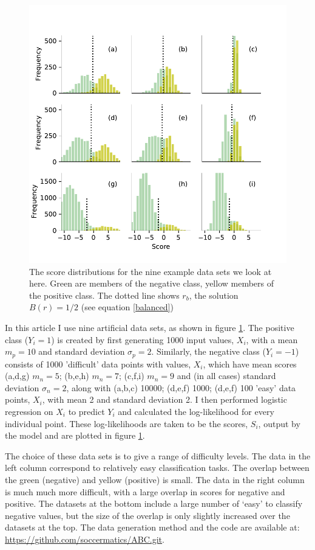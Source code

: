 \documentclass{article}
\begin{document}
\begin{figure}[t]
\centering
\includegraphics[scale=1]{Distribution.pdf}
\caption{The score distributions for the nine example data sets we look at here. Green are members of the negative class, yellow members of the positive class. The dotted line shows $r_b$, the solution $B(r)=1/2$ (see equation \ref{balanced})} \label{fig:Distribution}
\end{figure}

In this article I use nine artificial data sets, as shown in figure \ref{fig:Distribution}. The positive class ($Y_i=1$) is created by first generating 1000 input values, $X_i$, with a mean $m_p=10$ and standard deviation $\sigma_p=2$. Similarly, the negative class ($Y_i=-1$) consists of 1000 'difficult' data points with values, $X_i$, which have mean scores (a,d,g) $m_n=5$; (b,e,h) $m_n=7$; (c,f,i) $m_n=9$ and (in all cases) standard deviation $\sigma_n=2$, along with (a,b,c) 10000; (d,e,f) 1000; (d,e,f) 100 'easy' data points, $X_i$, with mean 2 and standard deviation 2.  I then performed logistic regression on $X_i$ to predict $Y_i$ and calculated the log-likelihood for every individual point. These log-likelihoods are taken to be the scores, $S_i$, output by the model and are plotted in figure \ref{fig:Distribution}. 

The choice of these data sets is to give a range of difficulty levels. The data in the left column correspond to relatively easy classification tasks. The overlap between the green (negative) and yellow (positive) is small. The data in the right column is much much more difficult, with a large overlap in scores for negative and positive. The datasets at the bottom include a large number of `easy' to classify negative values, but the size of the overlap is only slightly increased over the datasets at the top. The data generation method and the code are available at: \href{https://github.com/soccermatics/ABC.git}{https://github.com/soccermatics/ABC.git}. 
\end{document}
